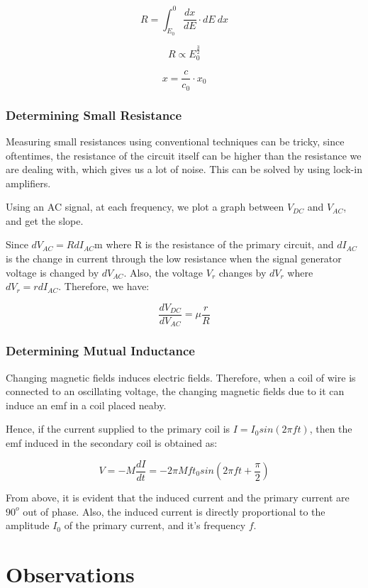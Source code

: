 \documentclass[a4paper]{article}
\begin{document}
$$R=\int_{E_0}^{0} \frac{dx}{dE} \cdot dE \ dx$$

$$R\propto E_0^{\frac{3}{2}}$$

$$x=\frac{c}{c_0}\cdot x_0$$


\subsubsection*{Determining Small Resistance}

Measuring small resistances using conventional techniques can be tricky, since oftentimes, the resistance of the circuit itself can be higher than the resistance we are dealing with, which gives us a lot of noise. This can be solved by using lock-in amplifiers. 

Using an AC signal, at each frequency, we plot a graph between $V_{DC}$ and $V_{AC}$, and get the slope.

Since $dV_{AC}=RdI_{AC}$m where R is the resistance of the primary circuit, and $dI_{AC}$ is the change in current through the low resistance when the signal generator voltage is changed by $dV_{AC}$. Also, the voltage $V_r$ changes by $dV_r$ where $dV_r=rdI_{AC}$. Therefore, we have:

$$
\frac{dV_{DC}}{dV_{AC}}=\mu \frac{r}{R}
$$



\subsubsection*{Determining Mutual Inductance}

Changing magnetic fields induces electric fields. Therefore, when a coil of wire is connected to an oscillating voltage, the changing magnetic fields due to it can induce an emf in a coil placed neaby.

Hence, if the current supplied to the primary coil is $ I=I_0sin(2\pi f t)$,
then the emf induced in the secondary coil is obtained as:

$$
V=-M\frac{dI}{dt}= -2\pi Mft_0 sin(2\pi f t+\frac{\pi}{2})
$$

From above, it is evident that the induced current and the primary current are $90^o$ out of phase. Also, the induced current is directly proportional to the amplitude $I_0$ of the primary current, and it's frequency $f$.

\section*{Observations}
\end{document}
